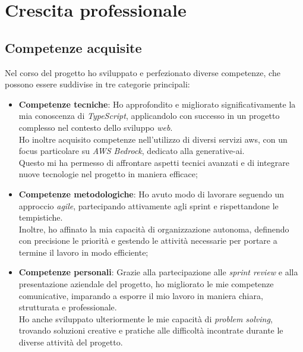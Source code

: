 \section{Crescita professionale}
\label{sez:crescita-professionale}



\pagebreak
\subsection{Competenze acquisite}
Nel corso del progetto ho sviluppato e perfezionato diverse competenze, che possono essere suddivise in tre categorie principali:

\begin{itemize}
\item \textbf{Competenze tecniche}:
Ho approfondito e migliorato significativamente la mia conoscenza di \textit{TypeScript}, applicandolo con successo in un progetto complesso nel contesto dello sviluppo \textit{web}. \\
Ho inoltre acquisito competenze nell'utilizzo di diversi servizi \gls{aws}, con un focus particolare su \textit{AWS Bedrock}, dedicato alla \gls{generative-ai}.\\
Questo mi ha permesso di affrontare aspetti tecnici avanzati e di integrare nuove tecnologie nel progetto in maniera efficace;
\item \textbf{Competenze metodologiche}:  
Ho avuto modo di lavorare seguendo un approccio \textit{agile}, partecipando attivamente agli \gls{sprint} e rispettandone le tempistiche. \\  
Inoltre, ho affinato la mia capacità di organizzazione autonoma, definendo con precisione le priorità e gestendo le attività necessarie per portare a termine il lavoro in modo efficiente;

\item \textbf{Competenze personali}:  
Grazie alla partecipazione alle \textit{sprint review} e alla presentazione aziendale del progetto, ho migliorato le mie competenze comunicative, imparando a esporre il mio lavoro in maniera chiara, strutturata e professionale. \\  
Ho anche sviluppato ulteriormente le mie capacità di \textit{problem solving}, trovando soluzioni creative e pratiche alle difficoltà incontrate durante le diverse attività del progetto.  
\end{itemize}